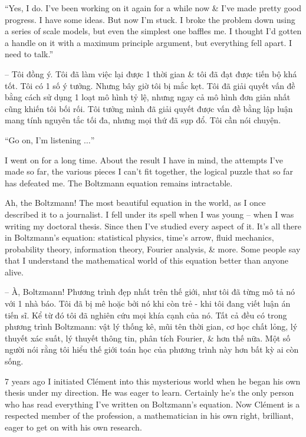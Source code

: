 \documentclass{article}
\begin{document}
\begin{enumerate}
	``Yes, I do. I've been working on it again for a while now \& I've made pretty good progress. I have some ideas. But now I'm stuck. I broke the problem down using a series of scale models, but even the simplest one baffles me. I thought I'd gotten a handle on it with a maximum principle argument, but everything fell apart. I need to talk.''

	-- Tôi đồng ý. Tôi đã làm việc lại được 1 thời gian \& tôi đã đạt được tiến bộ khá tốt. Tôi có 1 số ý tưởng. Nhưng bây giờ tôi bị mắc kẹt. Tôi đã giải quyết vấn đề bằng cách sử dụng 1 loạt mô hình tỷ lệ, nhưng ngay cả mô hình đơn giản nhất cũng khiến tôi bối rối. Tôi tưởng mình đã giải quyết được vấn đề bằng lập luận mang tính nguyên tắc tối đa, nhưng mọi thứ đã sụp đổ. Tôi cần nói chuyện.

	``Go on, I'm listening $\ldots$''

	I went on for a long time. About the result I have in mind, the attempts I've made so far, the various pieces I can't fit together, the logical puzzle that so far has defeated me. The Boltzmann equation remains intractable.

	Ah, the Boltzmann! The most beautiful equation in the world, as I once described it to a journalist. I fell under its spell when I was young -- when I was writing my doctoral thesis. Since then I've studied every aspect of it. It's all there in Boltzmann's equation: statistical physics, time's arrow, fluid mechanics, probability theory, information theory, Fourier analysis, \& more. Some people say that I understand the mathematical world of this equation better than anyone alive.

	-- À, Boltzmann! Phương trình đẹp nhất trên thế giới, như tôi đã từng mô tả nó với 1 nhà báo. Tôi đã bị mê hoặc bởi nó khi còn trẻ - khi tôi đang viết luận án tiến sĩ. Kể từ đó tôi đã nghiên cứu mọi khía cạnh của nó. Tất cả đều có trong phương trình Boltzmann: vật lý thống kê, mũi tên thời gian, cơ học chất lỏng, lý thuyết xác suất, lý thuyết thông tin, phân tích Fourier, \& hơn thế nữa. Một số người nói rằng tôi hiểu thế giới toán học của phương trình này hơn bất kỳ ai còn sống.

	7 years ago I initiated {\sc Cl\'ement} into this mysterious world when he began his own thesis under my direction. He was eager to learn. Certainly he's the only person who has read everything I've written on Boltzmann's equation. Now {\sc Cl\'ement} is a respected member of the profession, a mathematician in his own right, brilliant, eager to get on with his own research.


\end{enumerate}
\end{document}
